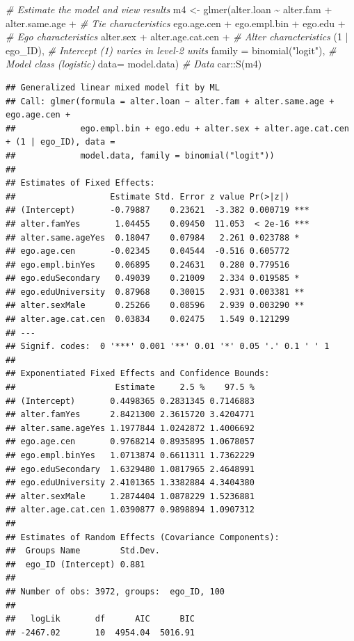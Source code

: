\documentclass[
]{book}
\newenvironment{Shaded}{\begin{snugshade}}{\end{snugshade}}
\newcommand{\AttributeTok}[1]{\textcolor[rgb]{0.77,0.63,0.00}{#1}}
\newcommand{\CommentTok}[1]{\textcolor[rgb]{0.56,0.35,0.01}{\textit{#1}}}
\newcommand{\DecValTok}[1]{\textcolor[rgb]{0.00,0.00,0.81}{#1}}
\newcommand{\FunctionTok}[1]{\textcolor[rgb]{0.00,0.00,0.00}{#1}}
\newcommand{\NormalTok}[1]{#1}
\newcommand{\OtherTok}[1]{\textcolor[rgb]{0.56,0.35,0.01}{#1}}
\newcommand{\SpecialCharTok}[1]{\textcolor[rgb]{0.00,0.00,0.00}{#1}}
\newcommand{\StringTok}[1]{\textcolor[rgb]{0.31,0.60,0.02}{#1}}
\begin{document}
\begin{Shaded}
\begin{Highlighting}[]
\CommentTok{\# Estimate the model and view results}
\NormalTok{m4 }\OtherTok{\textless{}{-}} \FunctionTok{glmer}\NormalTok{(alter.loan }\SpecialCharTok{\textasciitilde{}}\NormalTok{ alter.fam }\SpecialCharTok{+}\NormalTok{ alter.same.age }\SpecialCharTok{+} \CommentTok{\# Tie characteristics}
\NormalTok{              ego.age.cen }\SpecialCharTok{+}\NormalTok{ ego.empl.bin }\SpecialCharTok{+}\NormalTok{ ego.edu }\SpecialCharTok{+} \CommentTok{\# Ego characteristics}
\NormalTok{              alter.sex }\SpecialCharTok{+}\NormalTok{ alter.age.cat.cen }\SpecialCharTok{+} \CommentTok{\# Alter characteristics}
\NormalTok{              (}\DecValTok{1} \SpecialCharTok{|}\NormalTok{ ego\_ID), }\CommentTok{\# Intercept (1) varies in level{-}2 units}
            \AttributeTok{family =} \FunctionTok{binomial}\NormalTok{(}\StringTok{"logit"}\NormalTok{), }\CommentTok{\# Model class (logistic)}
            \AttributeTok{data=}\NormalTok{ model.data) }\CommentTok{\# Data}
\NormalTok{car}\SpecialCharTok{::}\FunctionTok{S}\NormalTok{(m4)}
\end{Highlighting}
\end{Shaded}

\begin{verbatim}
## Generalized linear mixed model fit by ML
## Call: glmer(formula = alter.loan ~ alter.fam + alter.same.age + ego.age.cen +
##             ego.empl.bin + ego.edu + alter.sex + alter.age.cat.cen + (1 | ego_ID), data =
##             model.data, family = binomial("logit"))
## 
## Estimates of Fixed Effects:
##                   Estimate Std. Error z value Pr(>|z|)    
## (Intercept)       -0.79887    0.23621  -3.382 0.000719 ***
## alter.famYes       1.04455    0.09450  11.053  < 2e-16 ***
## alter.same.ageYes  0.18047    0.07984   2.261 0.023788 *  
## ego.age.cen       -0.02345    0.04544  -0.516 0.605772    
## ego.empl.binYes    0.06895    0.24631   0.280 0.779516    
## ego.eduSecondary   0.49039    0.21009   2.334 0.019585 *  
## ego.eduUniversity  0.87968    0.30015   2.931 0.003381 ** 
## alter.sexMale      0.25266    0.08596   2.939 0.003290 ** 
## alter.age.cat.cen  0.03834    0.02475   1.549 0.121299    
## ---
## Signif. codes:  0 '***' 0.001 '**' 0.01 '*' 0.05 '.' 0.1 ' ' 1
## 
## Exponentiated Fixed Effects and Confidence Bounds:
##                    Estimate     2.5 %    97.5 %
## (Intercept)       0.4498365 0.2831345 0.7146883
## alter.famYes      2.8421300 2.3615720 3.4204771
## alter.same.ageYes 1.1977844 1.0242872 1.4006692
## ego.age.cen       0.9768214 0.8935895 1.0678057
## ego.empl.binYes   1.0713874 0.6611311 1.7362229
## ego.eduSecondary  1.6329480 1.0817965 2.4648991
## ego.eduUniversity 2.4101365 1.3382884 4.3404380
## alter.sexMale     1.2874404 1.0878229 1.5236881
## alter.age.cat.cen 1.0390877 0.9898894 1.0907312
## 
## Estimates of Random Effects (Covariance Components):
##  Groups Name        Std.Dev.
##  ego_ID (Intercept) 0.881   
## 
## Number of obs: 3972, groups:  ego_ID, 100
## 
##   logLik       df      AIC      BIC 
## -2467.02       10  4954.04  5016.91
\end{verbatim}
\end{document}

